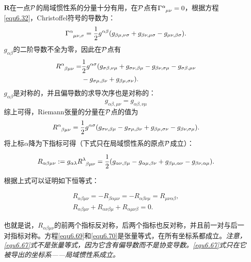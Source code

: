 $\mathbf{R}$在一点$\mathcal{P}$的局域惯性系的分量十分有用，在$\mathcal{P}$点有$\Gamma\indices{^\alpha_{\mu \nu}} = 0$，根据方程\eqref{equ6.32}，Christoffel符号的导数为：
\begin{equation}
    \Gamma\indices{^\alpha_{\mu \nu, \sigma}} = \frac{1}{2} g^{\alpha \beta} (g_{\beta \mu, \nu \sigma} + g_{\beta \nu, \mu \sigma} - g_{\mu \nu, \beta \sigma}).
\label{equ6.64}
\end{equation}
$g_{\alpha \beta}$的二阶导数不全为零，因此在$\mathcal{P}$点有
\begin{align}
    R\indices{^\alpha_{\beta \mu \nu}} =& \frac{1}{2} g^{\alpha \sigma} ( g_{\sigma \beta, \nu \mu} + g_{\sigma \nu, \beta \mu} - g_{\beta \nu, \sigma \mu} - g_{\sigma \beta, \mu \nu} \notag \\
    &- g_{\sigma \mu, \beta \nu} + g_{\beta \mu, \sigma \nu} ). \label{equ6.65}
\end{align}
$g_{\alpha \beta}$是对称的，并且偏导数的求导次序也是对称的：
\begin{equation}
    g_{\alpha \beta, \mu \nu} = g_{\alpha \beta, \nu \mu}
\label{equ6.66}
\end{equation}
综上可得，Riemann张量的分量在$\mathcal{P}$点的值为
\begin{equation}
    R\indices{^\alpha_{\beta \mu \nu}} = \frac{1}{2} g^{\alpha \sigma} (g_{\sigma \nu, \beta \mu} - g_{\sigma \mu, \beta \nu} + g_{\beta \mu, \sigma \nu} - g_{\beta \nu, \sigma \mu}).
\label{equ6.67}
\end{equation}
将上标$\alpha$降为下指标可得（下式只在局域惯性系的原点$\mathcal{P}$成立）：
\begin{shaded}
\begin{equation}
    R_{\alpha \beta \mu \nu} := g_{\alpha \lambda} R\indices{^\lambda_{\beta \mu \nu}} = \frac{1}{2} ( g_{\alpha \nu, \beta \mu} - g_{\alpha \mu, \beta \nu} + g_{\beta \mu, \alpha \nu} - g_{\beta \nu, \alpha \mu}).
\label{equ6.68}
\end{equation}
\end{shaded}
根据上式可以证明如下恒等式：
\begin{shaded}
\begin{align}
    R_{\alpha \beta \mu \nu} = -R_{\beta \alpha \mu \nu} = -R_{\alpha \beta \nu \mu} = R_{\mu \nu \alpha \beta}, \label{equ6.69} \\
    R_{\alpha \beta \mu \nu} + R_{\alpha \nu \beta \mu} + R_{\alpha \mu \nu \beta} = 0. \label{equ6.70}
\end{align}
\end{shaded}
也就是说，$R_{\alpha \beta \mu \nu}$的前两个指标反对称，后两个指标也反对称，并且前一对与后一对指标对称。方程\eqref{equ6.69}和\eqref{equ6.70}是张量等式，在所有坐标系都成立。\textit{注意，\eqref{equ6.67}式不是张量等式，因为它含有偏导数而不是协变导数。\eqref{equ6.67}式只在它被导出的坐标系——局域惯性系成立。}

